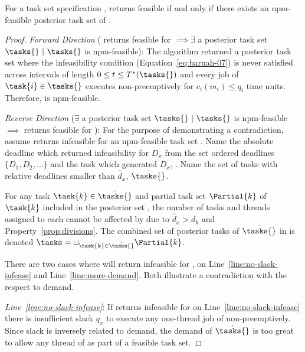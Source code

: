 \begin{theorem}
  \label{thm:tpj-optimal}
  For a task set specification \ants{}, \tpj{} returns feasible if and
  only if there exists an npm-feasible posterior task set \tasks{} of
  \ants{}.

  \begin{proof}
    \emph{Forward Direction} (\tpj{} returns feasible for \ants{}
    ${\implies \exists}$ a posterior task set ${\tasks{}~|~\tasks{}}$
    is npm-feasible): The \tpj{} algorithm returned a 
    posterior task set \tasks{} where the infeasibility condition
    (Equation~\ref{eq:baruah-07}) is never satisfied across intervals
    of length ${0 \le t \le T^*(\tasks{})}$ and every job of
    ${\task{i} \in \tasks{}}$ executes non-preemptively for ${c_i(m_i)
      \le q_i}$ time units. Therefore, \tasks{} is npm-feasible. 

    \emph{Reverse Direction} (${\exists}$ a posterior task set
    ${\tasks{}~|~\tasks{}}$ is npm-feasible ${\implies}$ \tpj{}
    returns feasible for \ants{}): For the purpose of demonstrating a
    contradiction, assume \tpj{} returns infeasible for an
    npm-feasible task set \ants{}. Name the absolute deadline which
    \tpj{} returned infeasibility for ${D_x}$ from the set
    ordered deadlines ${\{D_1, D_2, ... \}}$ and the task which
    generated ${D_x}$, . Name the set of tasks with relative
    deadlines smaller than ${\hat{d}_x}$, ${\bar{\tasks{}}}$. 

    For any task ${\task{k} \in \bar{\tasks{}}}$ and partial task set
    ${\Partial{k}}$ of ${\task{k}}$ included in the posterior set
    \tasks{}, the number of tasks and threads assigned to each
     cannot be affected by  due to
    ${\hat{d}_x > d_k}$ and Property~\ref{prop:divisions}. The
    combined set of posterior tasks of ${\bar{\tasks{}}}$ in \tasks{}
    is denoted
    ${\dot{\tasks} = \cup_{\task{k} \in \bar{\tasks{}}} \Partial{k}}$.
    
    There are two cases where \tpj{} will return infeasible for
    \ants{}, on Line~\ref{line:no-slack-infease} and
    Line~\ref{line:more-demand}. Both illustrate a contradiction with 
    the respect to demand.

    \emph{Line~\ref{line:no-slack-infease}}: If \tpj{} returns
    infeasible for \ants{} on Line~\ref{line:no-slack-infease} there is
    insufficient slack ${q_x}$ to execute any one-thread job of
     non-preemptively. Since slack is inversely related to
    demand, the demand of ${\dot{\tasks{}}}$ is too great to allow any
    thread of  as part of a feasible task set.


\end{proof}
\end{theorem}
